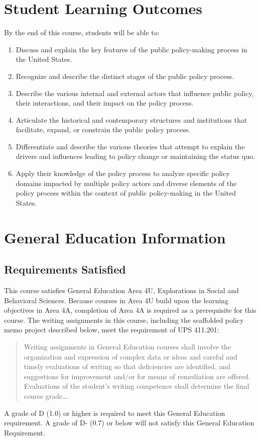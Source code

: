 \documentclass[12pt]{article}
\begin{document}
\section*{Student Learning Outcomes}

{\setlength{\parindent}{0pt}\setlength{\parskip}{0.6\baselineskip}%
By the end of this course, students will be able to:

\begin{enumerate}
    \item Discuss and explain the key features of the public policy-making process in the United States.
    \item Recognize and describe the distinct stages of the public policy process.
    \item Describe the various internal and external actors that influence public policy, their interactions, and their impact on the policy process.
    \item Articulate the historical and contemporary structures and institutions that facilitate, expand, or constrain the public policy process.
    \item Differentiate and describe the various theories that attempt to explain the drivers and influences leading to policy change or maintaining the status quo.
    \item Apply their knowledge of the policy process to analyze specific policy domains impacted by multiple policy actors and diverse elements of the policy process within the context of public policy-making in the United States.
\end{enumerate}
}

\section*{General Education Information}

\subsection*{Requirements Satisfied}
This course satisfies General Education Area 4U, Explorations in Social and Behavioral Sciences. Because courses in Area 4U build upon the learning objectives in Area 4A, completion of Area 4A is required as a prerequisite for this course. The writing assignments in this course, including the scaffolded policy memo project described below, meet the requirement of UPS 411.201:
\begin{quote}Writing assignments in General Education courses shall involve the organization and expression of complex data or ideas and careful and timely evaluations of writing so that deficiencies are identified, and suggestions for improvement and/or for means of remediation are offered. Evaluations of the student's writing competence shall determine the final course grade\ldots .\end{quote}
A grade of D (1.0) or higher is required to meet this General Education requirement. A grade of D- (0.7) or below will not satisfy this General Education Requirement.
\end{document}
